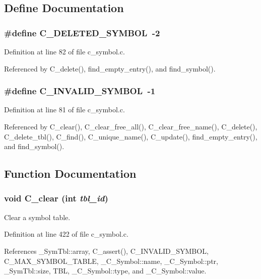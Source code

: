 \subsection{Define Documentation}
\subsubsection{\setlength{\rightskip}{0pt plus 5cm}\#define C\_\-DELETED\_\-SYMBOL~-2}\label{c__symbol_8c_bf5e249efc890415e31c975dbfadd0b2}




Definition at line 82 of file c\_\-symbol.c.

Referenced by C\_\-delete(), find\_\-empty\_\-entry(), and find\_\-symbol().
\subsubsection{\setlength{\rightskip}{0pt plus 5cm}\#define C\_\-INVALID\_\-SYMBOL~-1}\label{c__symbol_8c_7a35993923e366f01538efcd5d2eff91}




Definition at line 81 of file c\_\-symbol.c.

Referenced by C\_\-clear(), C\_\-clear\_\-free\_\-all(), C\_\-clear\_\-free\_\-name(), C\_\-delete(), C\_\-delete\_\-tbl(), C\_\-find(), C\_\-unique\_\-name(), C\_\-update(), find\_\-empty\_\-entry(), and find\_\-symbol().

\subsection{Function Documentation}
\subsubsection{\setlength{\rightskip}{0pt plus 5cm}void C\_\-clear (int {\em tbl\_\-id})}\label{c__symbol_8c_2c6a25544c7672e28467bbcd9b55a579}


Clear a symbol table. 

Definition at line 422 of file c\_\-symbol.c.

References \_\-Sym\-Tbl::array, C\_\-assert(), C\_\-INVALID\_\-SYMBOL, C\_\-MAX\_\-SYMBOL\_\-TABLE, \_\-C\_\-Symbol::name, \_\-C\_\-Symbol::ptr, \_\-Sym\-Tbl::size, TBL, \_\-C\_\-Symbol::type, and \_\-C\_\-Symbol::value.

